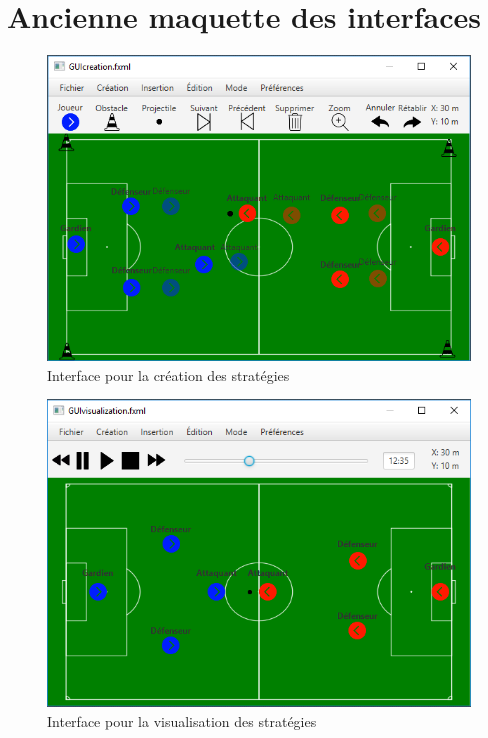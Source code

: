 
\chapter{Ancienne maquette des interfaces}
\label{s:maquettes_interfaces}

\begin{figure}[htpb]
    \centering
    \includegraphics[scale=0.6]{fig/gui/gui_creation.png}
    \caption{Interface pour la création des stratégies}
    \label{fig:gui:gui_creation}
\end{figure}

\begin{figure}[htpb]
    \centering
    \includegraphics[scale=0.6]{fig/gui/gui_visualisation.png}
    \caption{Interface pour la visualisation des stratégies}
    \label{fig:gui:gui_visualisation}
\end{figure}

